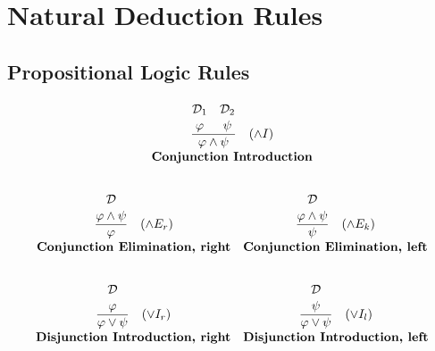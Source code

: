 
%


\chapter{Natural Deduction Rules}
\label{ann:nd_rules}

\section{Propositional Logic Rules}
\[
\begin{array}{c c}

\multicolumn{2}{c}{
\frac{\overset{\displaystyle\mathcal{D}_1\strut}{\displaystyle \varphi \strut}\quad \overset{\displaystyle\mathcal{D}_2\strut} {\displaystyle \psi \strut}}{\displaystyle \varphi \land \psi \strut} \quad (\land I)
} \\[5pt]
\multicolumn{2}{c}{\textbf{Conjunction Introduction}} \\[10pt]
\end{array}
\]

\[
\begin{array}{c c}

\frac{\displaystyle \overset{\displaystyle\mathcal{D} \strut} {\varphi \land \psi \strut}}{\displaystyle \varphi \strut} \quad (\land E_r) 
& \frac{\displaystyle \overset{\displaystyle\mathcal{D} \strut} {\varphi \land \psi \strut}}{\displaystyle \psi \strut} \quad (\land E_k) \\[5pt]
\textbf{Conjunction Elimination, right} & \textbf{Conjunction Elimination, left} \\[10pt]
\end{array}
\]

\[
\begin{array}{c c}
\frac{\displaystyle \overset{\displaystyle\mathcal{D} \strut} {\varphi 
\strut}}{\displaystyle \varphi \vee \psi \strut} \quad (\vee I_r) 
& \frac{\displaystyle \overset{\displaystyle\mathcal{D} \strut} {\psi \strut}}{\displaystyle \varphi \vee \psi \strut} \quad (\vee I_l) \\[5pt]
\textbf{Disjunction Introduction, right} & \textbf{Disjunction Introduction, left} \\[10pt]

\end{array}
\]

